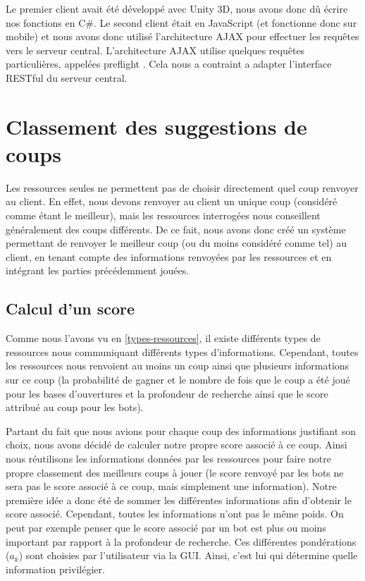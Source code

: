 \documentclass[a4paper,11pt]{article}
\begin{document}
Le premier client avait été développé avec Unity 3D, nous avons donc dû écrire nos fonctions en C\#. Le second client était en JavaScript (et fonctionne donc sur mobile) et nous avons donc utilisé l'architecture AJAX pour effectuer les requêtes vers le serveur central. L'architecture AJAX utilise quelques requêtes particulières, appelées preflight \cite{ajax-preflight}. Cela nous a contraint a adapter l'interface RESTful du serveur central.


\section{Classement des suggestions de coups}

	Les ressources seules ne permettent pas de choisir directement quel coup renvoyer au client. En effet, nous devons renvoyer au client un unique coup (considéré comme étant le meilleur), mais les ressources interrogées nous conseillent généralement des coups différents.
De ce fait, nous avons donc créé un système permettant de renvoyer le meilleur coup (ou du moins considéré comme tel) au client, en tenant compte des informations renvoyées par les ressources et en intégrant les parties précédemment jouées.

\subsection{Calcul d'un score}
\label{confiance-ressources}
Comme nous l'avons vu en \ref{types-ressources}, il existe différents types de ressources nous communiquant différents types d'informations.
Cependant, toutes les ressources nous renvoient au moins un coup ainsi que plusieurs informations sur ce coup (la probabilité de gagner et le nombre de fois que le coup a été joué pour les bases d'ouvertures et la profondeur de recherche ainsi que le score attribué au coup pour les bots).

Partant du fait que nous avions pour chaque coup des informations justifiant son choix, nous avons décidé de calculer notre propre score associé à ce coup. Ainsi nous réutilisons les informations données par les ressources pour faire notre propre classement des meilleurs coups à jouer (le score renvoyé par les bots ne sera pas le score associé à ce coup, mais simplement une information).
Notre première idée a donc été de sommer les différentes informations afin d'obtenir le score associé. Cependant, toutes les informations n'ont pas le même poids. On peut par exemple penser que le score associé par un bot est plus ou moins important par rapport à la profondeur de recherche. Ces différentes pondérations (\(a_{k}\)) sont choisies par l'utilisateur via la GUI. Ainsi, c'est lui qui détermine quelle information privilégier. 
\end{document}
